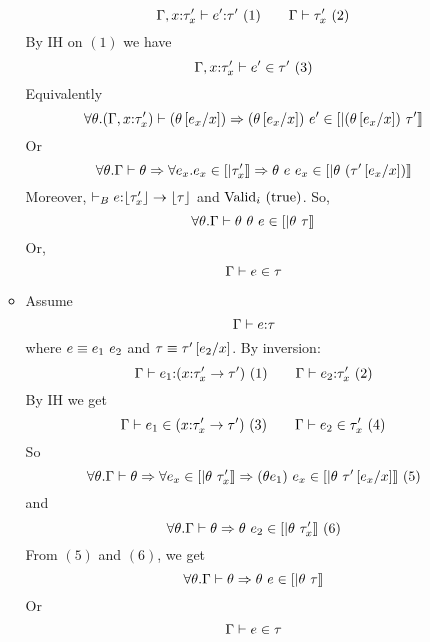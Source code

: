 \begin{enumerate}
\begin{itemize}
$$
	\hastype{\Gamma, x\colon\tau'_x}{e'}{\tau'}\ (1) \qquad
	\iswellformed{\Gamma}{\tau'_x}\ (2)
$$
By IH on $(1)$ we have
$$
	\shastype{\Gamma, x\colon\tau'_x}{e'}{\tau'}\ (3)
$$
Equivalently
$$	
\forall \theta . \iswellformed{(\Gamma,x\colon\tau'_x)}{(\theta\sub{x}{e_x})} 
	\Rightarrow (\theta\sub{x}{e_x})\ e' \in \interp{(\theta\sub{x}{e_x}) \ \tau'}\\
$$
Or
$$	
\forall \theta . \iswellformed{\Gamma}{\theta} \Rightarrow
\forall e_x . e_x \in \interp{\tau'_x} \Rightarrow
	\theta\ \eapp{e}{e_x} \in \interp{\theta \ (\tau'\sub{x}{e_x})}\\
$$
Moreover, $\hastypebase{}{e}{\erase{\tau'_x}\rightarrow{\erase{\tau}}}$
	and  $\validi{\etrue}$.
So,
$$	
\forall \theta . \iswellformed{\Gamma}{\theta}\ \theta\ e\in \interp{\theta\ \tau}
$$
Or, $$\shastype{\Gamma}{e}{\tau}$$
\item\rtapp
Assume
$$\hastype{\Gamma}{e}{\tau}$$
where $e\equiv\eapp{e_1}{e_2}$ and $\tau\equiv\tau'\sub{x}{e_2}$.
By inversion:
$$
	\hastype{\Gamma}{e_1}{(\tfunref{x}{\tau'_{x}}{\tau'}{v}{e_r})}\ (1)\qquad
	\hastype{\Gamma}{e_2}{\tau'_{x}}\ (2)
$$
By IH we get
$$
	\shastype{\Gamma}{e_1}{(\tfunref{x}{\tau'_{x}}{\tau'}{v}{e_r})}\ (3)\qquad
	\shastype{\Gamma}{e_2}{\tau'_{x}}\ (4)
$$
So 
$$\forall \theta. \iswellformed{\Gamma}{\theta}\Rightarrow
\forall e_x \in \interp{\theta\ \tau'_x} \Rightarrow
	\eapp{(\theta e_1)}{e_x} \in \interp{\theta\ \tau'\sub{x}{e_x}}
\ (5)$$
and
$$\forall \theta. \iswellformed{\Gamma}{\theta}\Rightarrow
	\theta\ e_2 \in \interp{\theta\ \tau'_x}
\ (6)$$
From $(5)$ and $(6)$, we get
$$\forall \theta. \iswellformed{\Gamma}{\theta}\Rightarrow
	\theta\ e \in \interp{\theta\ \tau}
$$
Or $$\shastype{\Gamma}{e}{\tau}$$
\end{itemize}
\end{enumerate}
